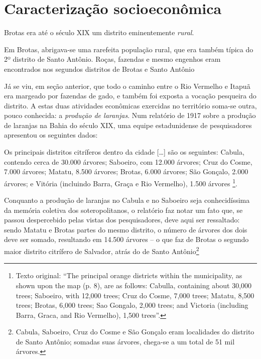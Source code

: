 \section{Caracterização socioeconômica}\label{sec:2.2}

Brotas era até o século XIX um distrito eminentemente \textit{rural}.

\begin{citacao}
Em Brotas, abrigava-se uma rarefeita população rural, que era também típica do 2º distrito de Santo Antônio. Roças, fazendas e mesmo engenhos eram encontrados nos segundos distritos de Brotas e Santo Antônio \cite[p.~52]{NASCIMENTO2007}
\end{citacao}

Já se viu, em seção anterior, que todo o caminho entre o Rio Vermelho e Itapuã era margeado por fazendas de gado, e também foi exposta a vocação pesqueira do distrito. A estas duas atividades econômicas exercidas no território soma-se outra, pouco conhecida: a \textit{produção de laranjas}. Num relatório de 1917 sobre a produção de laranjas na Bahia do século XIX, uma equipe estadunidense de pesquisadores apresentou os seguintes dados:

\begin{citacao}
Os principais distritos citríferos dentro da cidade [\dots] são os seguintes: Cabula, contendo cerca de 30.000 árvores; Saboeiro, com 12.000 árvores; Cruz do Cosme, 7.000 árvores; Matatu, 8.500 árvores; Brotas, 6.000 árvores; São Gonçalo, 2.000 árvores; e Vitória (incluindo Barra, Graça e Rio Vermelho), 1.500 árvores \cite[p.~3]{dorsett_orange_1917}\footnote{Texto original: ``The principal orange districts within the municipality, as shown upon the map (p. 8), are as follows: Cabulla, containing about 30,000 trees; Saboeiro, with 12,000 trees; Cruz do Cosme, 7,000 trees; Matatu, 8,500 trees; Brotas, 6,000 trees; Sao Gongalo, 2,000 trees; and Victoria (including Barra, Graca, and Rio Vermelho), 1,500 trees''.}.
\end{citacao}

Conquanto a produção de laranjas no Cabula e no Saboeiro seja conhecidíssima da memória coletiva dos soteropolitanos, o relatório faz notar um fato que, se passou despercebido pelas vistas dos pesquisadores, deve aqui ser ressaltado: sendo Matatu e Brotas partes do mesmo distrito, o número de árvores dos dois deve ser somado, resultando em 14.500 árvores -- o que faz de Brotas o segundo maior distrito citrífero de Salvador, atrás do de Santo Antônio\footnote{Cabula, Saboeiro, Cruz do Cosme e São Gonçalo eram localidades do distrito de Santo Antônio; somadas suas árvores, chega-se a um total de 51 mil árvores.}

